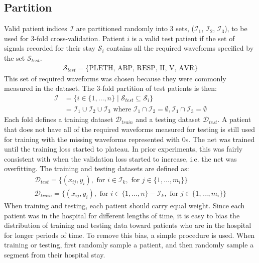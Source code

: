 \subsection{Partition}

Valid patient indices $\mathcal{I}$ are partitioned randomly into 3 sets, ($\mathcal{I}_1$, $\mathcal{I}_2$, $\mathcal{I}_3$), to be used for 3-fold cross-validation.  Patient $i$ is a valid test patient if the set of signals recorded for their stay $\mathcal{S}_i$ contains all the required waveforms specified by the set $\mathcal{S}_{test}$.
\begin{gather}
    \mathcal{S}_{test} = \{ \text{PLETH, ABP, RESP, II, V, AVR} \}
\end{gather}
This set of required waveforms was chosen because they were commonly measured in the dataset.  The 3-fold partition of test patients is then:
\begin{align}
    \mathcal{I} 
        &= \{
            i \in \{1, \dots, n\} \mid 
            \mathcal{S}_{test} \subseteq \mathcal{S}_i
        \} \\
        &= \mathcal{I}_1 \cup \mathcal{I}_2 \cup \mathcal{I}_3 \text{ where }
            \mathcal{I}_1 \cap \mathcal{I}_2 = \emptyset, \mathcal{I}_1 \cap \mathcal{I}_3 = \emptyset
\end{align}
Each fold defines a training dataset $\mathcal{D}_{train}$ and a testing dataset $\mathcal{D}_{test}$.  A patient that does not have all of the required waveforms measured for testing is still used for training with the missing waveforms represented with 0s.  The net was trained until the training loss started to plateau.  In prior experiments, this was fairly consistent with when the validation loss started to increase, i.e. the net was overfitting. The training and testing datasets are defined as:
\begin{gather}
    \mathcal{D}_{test} = \{
        (x_{ij}, y_i),
        \text{ for } i \in \mathcal{I}_k,
        \text{ for } j \in \{ 1, \dots, m_i \}
    \} \\
    \mathcal{D}_{train} = \{
        (x_{ij}, y_i),
        \text{ for } i \in \{1, \dots, n\} - \mathcal{I}_k,
        \text{ for } j \in \{ 1, \dots, m_i \}
    \}
\end{gather}
When training and testing, each patient should carry equal weight.  Since each patient was in the hospital for different lengths of time, it is easy to bias the distribution of training and testing data toward patients who are in the hospital for longer periods of time.  To remove this bias, a simple procedure is used.  When training or testing, first randomly sample a patient, and then randomly sample a segment from their hospital stay.
